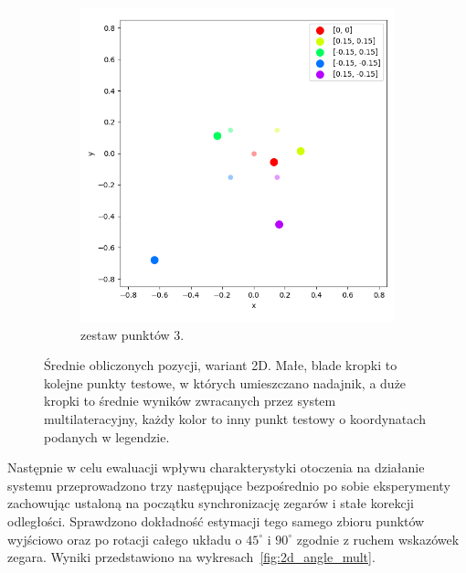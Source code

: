 \begin{figure}[H]
    \ContinuedFloat\centering
    \begin{subfigure}{.5\textwidth}
        \centering
        \includegraphics[width=\linewidth]{pics/mult_lat_2d/positions_3_mean.png}
        \caption{zestaw punktów 3.}
        \label{pic:2d_3_mult}
    \end{subfigure}
    \caption[Wyniki eksperymentu dla wersji 2D]{Średnie obliczonych pozycji, wariant 2D. Małe, blade kropki to kolejne punkty testowe, w których umieszczano nadajnik, a duże kropki to średnie wyników zwracanych przez system multilateracyjny, każdy kolor to inny punkt testowy o koordynatach podanych w legendzie.}
    \label{fig:2d_mult}
\end{figure}

Następnie w celu ewaluacji wpływu charakterystyki otoczenia na działanie systemu przeprowadzono trzy następujące bezpośrednio po sobie eksperymenty zachowując ustaloną na początku synchronizację zegarów i stałe korekcji odległości. Sprawdzono dokładność estymacji tego samego zbioru punktów wyjściowo oraz po rotacji całego układu o $45^{\circ}$ i $90^{\circ}$ zgodnie z ruchem wskazówek zegara. Wyniki przedstawiono na wykresach~\ref{fig:2d_angle_mult}. 

